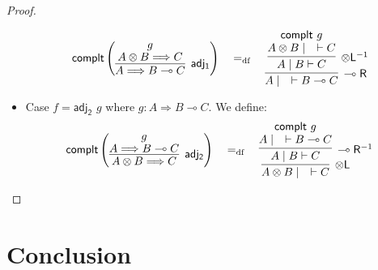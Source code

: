 \documentclass[submission,copyright,creativecommons]{eptcs}
\newcommand{\tl}{\otimes \mathsf{L}}
\newcommand{\lright}{\multimap \mathsf{R}}
\begin{document}
\begin{proof}
\begin{itemize}
  \begin{displaymath}
    \mathsf{complt} \left( \vcenter{
    \infer[\mathsf{adj_1}]{A\Longrightarrow B\multimap C}{
      \deduce{A\otimes B \Longrightarrow C}{g}
    }
    }
    \right)
                           \quad
                           =_{\text{df}}
                           \quad
                           \vcenter{
                           \infer[\lright]{A \mid \quad \vdash B \multimap C}{
                            \infer[\tl^{-1}]{A \mid B \vdash C}{
                              \deduce{A\otimes B \mid \quad \vdash C}{\mathsf{complt} \text{ } g}
                            }
                           }
                           }
  \end{displaymath}
  \item Case $f = \mathsf{adj_2}$ $g$ where $g : A \Longrightarrow B\multimap C$. We define:
  \begin{displaymath}
    \mathsf{complt} \left( \vcenter{
    \infer[\mathsf{adj_2}]{A \otimes B \Longrightarrow C}{
      \deduce{A \Longrightarrow B\multimap C}{g}
    }
    }
                           \right)
                           \quad
                           =_{\text{df}}
                           \quad
                           \vcenter{
                           \infer[\tl]{A \otimes B \mid \quad \vdash C}{
                            \infer[\lright^{-1}]{A \mid B \vdash C}{
                              \deduce{A \mid \quad \vdash B \multimap C}{\mathsf{complt} \text{ } g}
                            }
                           }
                           }
  \end{displaymath}
\end{itemize}
\end{proof}
\section{Conclusion}

  
  
\end{document}
